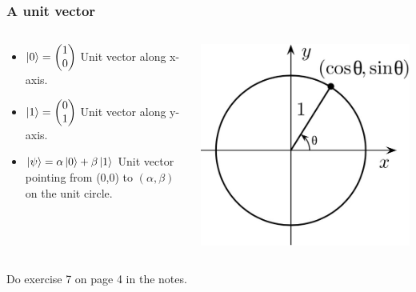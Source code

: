 \documentclass[10pt]{beamer}
\begin{document}
\begin{frame}
  \frametitle{A unit vector}
  \begin{columns}
    \begin{column}{0.5\linewidth}
      \begin{itemize}
      \item $\ket{0} =
        \begin{pmatrix}
          1 \\0 
        \end{pmatrix}
        $ Unit vector along x-axis.
      \item $\ket{1} =
        \begin{pmatrix}
         0 \\ 1 
        \end{pmatrix}$ Unit vector along y-axis.
      \item $\ket{\psi}=\alpha \ket{0}+\beta \ket{1}$ Unit vector pointing from (0,0) to $(\alpha , \beta)$ on the unit circle.
      \end{itemize}
    \end{column}
    \begin{column}{0.49\linewidth}
      \includegraphics[width=\linewidth]{img/unit-circle.jpg}
    \end{column}
  \end{columns}
   Do exercise 7 on page 4 in the notes.
\end{frame}
\end{document}
